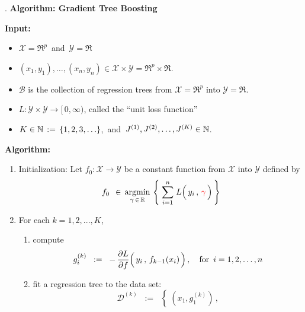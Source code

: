 \begin{center}
\begin{minipage}{6in}
\begin{tcolorbox}[width=0.95\linewidth,colback=white,colframe=gray]
	\begin{center}
	{\color{white}.}\vskip 0.1cm
	\textbf{\large Algorithm: Gradient Tree Boosting}
	\end{center}
	\textbf{Input:}
	\begin{itemize}
	\item
		$\mathcal{X} = \Re^{p}$\, and \,$\mathcal{Y} = \Re$
	\item
		$(x_{1},y_{1}), \ldots, (x_{n},y_{n}) \in \mathcal{X} \times \mathcal{Y} = \Re^{p} \times \Re$.
	\item
		$\mathcal{B}$ is the collection of regression trees from $\mathcal{X} = \Re^{p}$ into $\mathcal{Y} = \Re$.
	\item
		$L : \mathcal{Y} \times \mathcal{Y} \longrightarrow [\,0,\infty)$, called the ``unit loss function''
	\item
		$K \in \mathbb{N} \,:=\, \{1,2,3,\ldots\}$,\,
		and
		\,$J^{(1)},J^{(2)}, \ldots ,J^{(K)} \in \mathbb{N}$.
	\end{itemize}
	\vskip 0.3cm
	\textbf{Algorithm:}
	\begin{enumerate}
	\item
		Initialization:
		Let $f_{0} : \mathcal{X} \longrightarrow \mathcal{Y}$ be a constant function from $\mathcal{X}$ into $\mathcal{Y}$
		defined by
		\begin{equation*}
		f_{0}
		\;\,\in\,
			\underset{\gamma \,\in\, \Re}{\argmin}\,
			\left\{\;
				\overset{n}{\underset{i=1}{\sum}}\;
				L\!\left(\,y_{i}\,,\,\overset{{\color{white}1}}{{\color{red}\gamma}}\,\right)
				\,\right\}
		\end{equation*}
	\item
		For each $k = 1, 2, ... , K$, 
		\begin{enumerate}
		\item
			compute
			\begin{equation*}
			g^{(k)}_{i}
			\;\; := \;\;
				-\,\dfrac{\partial L}{\partial f}\!\left(\,y_{i}\,,\,\overset{{{\color{white}.}}}{f_{k-1}(x_{i})}\,\right),
			\quad
			\textnormal{for \,$i = 1,2,\ldots,n$}
			\end{equation*}
		\item
			fit a regression tree to the data set:
			\begin{equation*}
			\mathscr{D}^{(k)}
			\;\; := \;\;
				\left\{\;
					(x_{1},g^{(k)}_{1})\,,

\end{equation*}
\end{enumerate}
\end{enumerate}
\end{tcolorbox}
\end{minipage}
\end{center}

